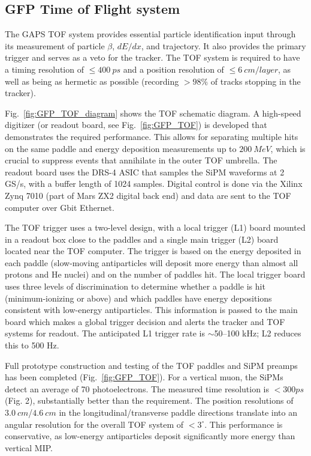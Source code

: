 \subsection{GFP Time of Flight system}
\label{chap:GAPS:GFP:TOF}
The \ac{GAPS} \ac{TOF} system provides essential particle identification input through its measurement of particle $ \beta $, $ dE/dx $, and trajectory. It also provides the primary trigger and serves as a veto for the tracker. The \ac{TOF} system is required to have a timing resolution of $\leq400~ps$ and a position resolution of $ \leq 6~cm/layer $, as well as being as hermetic as possible (recording $>98\%$ of tracks stopping in the tracker).

Fig.~\ref{fig:GFP_TOF_diagram} shows the \ac{TOF} schematic diagram. A high-speed digitizer (or readout board, see Fig.~\ref{fig:GFP_TOF}) is developed that demonstrates the required performance. This allows for separating multiple hits on the same paddle and energy deposition measurements up to $200~MeV$, which is crucial to suppress events that annihilate in the outer \ac{TOF} umbrella. The readout board uses the DRS-4 ASIC that samples the SiPM waveforms at 2 GS/s, with a buffer length of 1024 samples. Digital control is done via the Xilinx Zynq 7010 (part of Mars ZX2 digital back end) and data are sent to the \ac{TOF} computer over Gbit Ethernet.

The \ac{TOF} trigger uses a two-level design, with a local trigger (L1) board mounted in a readout box close to the paddles and a single main trigger (L2) board located near the \ac{TOF} computer. The trigger is based on the energy deposited in each paddle (slow-moving antiparticles will deposit more energy than almost all protons and He nuclei) and on the number of paddles hit. The local trigger board uses three levels of discrimination to determine whether a paddle is hit (minimum-ionizing or above) and which paddles have energy depositions consistent with low-energy antiparticles. This information is passed to the main board which makes a global trigger decision and alerts the tracker and \ac{TOF} systems for readout. The anticipated L1 trigger rate is $\sim$50--100 kHz; L2 reduces this to 500 Hz.

Full prototype construction and testing of the \ac{TOF} paddles and SiPM preamps has been completed (Fig.~\ref{fig:GFP_TOF}). For a vertical muon, the SiPMs detect an average of 70 photoelectrons. The measured time resolution is $<300 ps$ (Fig. 2), substantially better than the requirement. The position resolutions of $3.0~cm$/$4.6~cm$ in the longitudinal/transverse paddle directions translate into an angular resolution for the overall \ac{TOF} system of $<3^\circ$. This performance is conservative, as low-energy antiparticles deposit significantly more energy than vertical \ac{MIP}.

